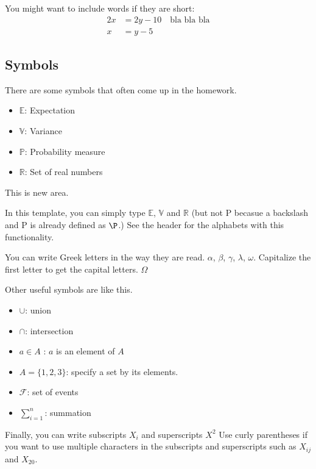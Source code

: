 \documentclass[11pt]{article}
\theoremstyle{quest}
\newcommand{\R}{\mathbb{R}}
\newcommand{\E}{\mathbb{E}}
\newcommand{\V}{\mathbb{V}}
\begin{document}
You might want to include words if they are short:
\begin{equation}
\begin{split}
  2x &= 2y-10 \quad \text{bla bla bla}\\
  x &=y -5  
\end{split}
\end{equation}


\subsection{Symbols}

There are some symbols that often come up in the homework. \\
\begin{itemize}
    \item $\mathbb{E}$: Expectation  
    \item $\mathbb{V}$: Variance
    \item $\mathbb{P}$: Probability measure
    \item $\mathbb{R}$: Set of real numbers
\end{itemize}
This is new area.

In this template, you can simply type $\E$, $\V$ and $\R$ (but not P becasue a backslash and P is already defined as $\P$.) 
See the header for the alphabets with this functionality. 

You can write Greek letters in the way they are read. $\alpha$, $\beta$, $\gamma$, 
$\lambda$, $\omega$. Capitalize the first letter to get the capital letters. $\Omega$

Other useful symbols are like this. 
\begin{itemize}
    \item $\cup$: union
    \item $\cap$: intersection
    \item $a \in A$ : $a$ is an element of $A$
    \item $A = \{1, 2, 3\}$: specify a set by its elements. 
    \item $\mathcal{F}$: set of events
    \item $\sum_{i=1}^n$: summation 
\end{itemize}

Finally, you can write subscripts $X_i$ and superscripts $X^2$
Use curly parentheses if you want to use multiple characters in the subscripts and superscripts such as $X_{ij}$ and $X_{20}$. 
\end{document}
